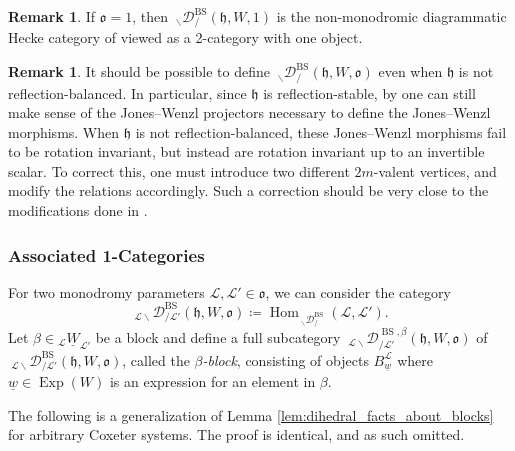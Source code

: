 \documentclass{amsart}
\newcommand{\scrL}{\mathcal{L}}
\DeclareMathOperator{\Hom}{Hom}
\newcommand{\fr}[1]{\mathfrak{#1}}
\DeclareMathOperator{\BS}{BS}
\newcommand{\EWmon}[2]{\:_{#1 \backslash} \mathcal{D}_{/ #2} }
\DeclareMathOperator{\Exp}{Exp}
\newcommand{\uW}[2]{{}_{#1}\underline{W}_{#2}}
\newcommand{\uw}{\underline{w}}
\theoremstyle{definition}
\newtheorem{remark}[subsubsection]{Remark}
\numberwithin{equation}{subsection}
\begin{document}
    \begin{remark}
        If $\fr{o} = 1$, then $\EWmon{}{}^{\BS} (\fr{h}, W, 1)$ is the non-monodromic diagrammatic Hecke category of \cite{EW} viewed as a 2-category with one object.
    \end{remark}

    \begin{remark}
        It should be possible to define $\EWmon{}{}^{\BS} (\fr{h}, W, \fr{o})$ even when $\fr{h}$ is not reflection-balanced.
        In particular, since $\fr{h}$ is reflection-stable, by \cite[Theorem B]{Hazi} one can still make sense of the Jones--Wenzl projectors necessary to define the Jones--Wenzl morphisms.
        When $\fr{h}$ is not reflection-balanced, these Jones--Wenzl morphisms fail to be rotation invariant, but instead are rotation invariant up to an invertible scalar.
        To correct this, one must introduce two different $2m$-valent vertices, and modify the relations accordingly. Such a correction should be very close to the modifications done in \cite[\S5.6]{EW}.
    \end{remark}

\subsubsection{Associated 1-Categories}
    For two monodromy parameters $\scrL, \scrL' \in \fr{o}$, we can consider the category 
    \[\EWmon{\scrL}{\scrL'}^{\BS} (\fr{h}, W, \fr{o}) \coloneq \Hom_{\EWmon{}{}^{\BS}} (\scrL, \scrL').\]
    Let $\beta \in \uW{\scrL}{\scrL'}$ be a block and define a full subcategory $\EWmon{\scrL}{\scrL'}^{\BS, \beta} (\fr{h}, W, \fr{o})$ of $\EWmon{\scrL}{\scrL'}^{\BS} (\fr{h}, W, \fr{o})$, called the \emph{$\beta$-block}, consisting of objects $B_{\uw}^{\scrL}$ where $\uw \in \Exp (W)$ is an expression for an element in $\beta$.

    The following is a generalization of Lemma \ref{lem:dihedral_facts_about_blocks} for arbitrary Coxeter systems. The proof is identical, and as such omitted.
\end{document}
